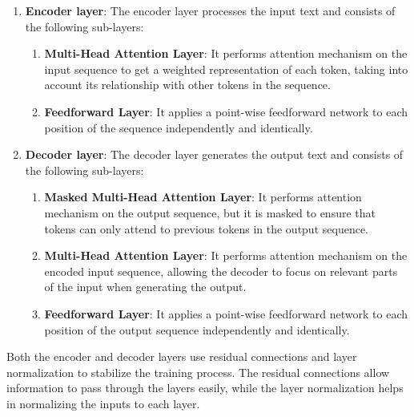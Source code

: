 \documentclass[12pt]{report}
\begin{document}
\begin{enumerate}
    \item {\bfseries Encoder layer}: The encoder layer processes the input text and consists of the following sub-layers:
    \begin{enumerate}
        \item {\bfseries Multi-Head Attention Layer}: It performs attention mechanism on the input sequence to get a weighted representation of each token, taking into account its relationship with other tokens in the sequence.
        \item {\bfseries Feedforward Layer}: It applies a point-wise feedforward network to each position of the sequence independently and identically.
    \end{enumerate}

    \item {\bfseries Decoder layer}: The decoder layer generates the output text and consists of the following sub-layers:
    \begin{enumerate}
        \item {\bfseries Masked Multi-Head Attention Layer}: It performs attention mechanism on the output sequence, but it is masked to ensure that tokens can only attend to previous tokens in the output sequence.
        \item {\bfseries Multi-Head Attention Layer}: It performs attention mechanism on the encoded input sequence, allowing the decoder to focus on relevant parts of the input when generating the output.
        \item {\bfseries Feedforward Layer}: It applies a point-wise feedforward network to each position of the output sequence independently and identically.
    \end{enumerate}
\end{enumerate}
Both the encoder and decoder layers use residual connections and layer normalization to stabilize the training process. The residual connections allow information to pass through the layers easily, while the layer normalization helps in normalizing the inputs to each layer.
\end{document}
